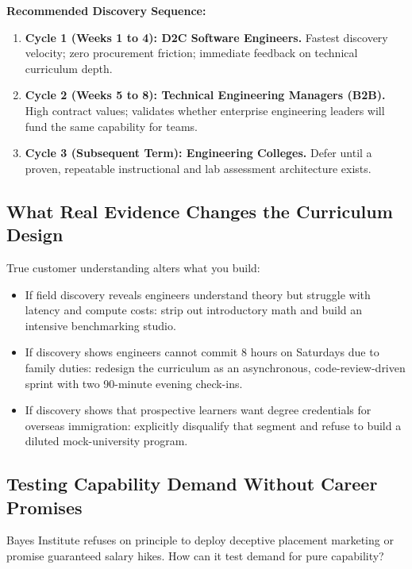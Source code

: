 \noindent\textbf{Recommended Discovery Sequence:}
\begin{enumerate}[leftmargin=1.2em,itemsep=0.2ex]
  \item \textbf{Cycle 1 (Weeks 1 to 4): D2C Software Engineers.} Fastest discovery velocity; zero procurement friction; immediate feedback on technical curriculum depth.
  \item \textbf{Cycle 2 (Weeks 5 to 8): Technical Engineering Managers (B2B).} High contract values; validates whether enterprise engineering leaders will fund the same capability for teams.
  \item \textbf{Cycle 3 (Subsequent Term): Engineering Colleges.} Defer until a proven, repeatable instructional and lab assessment architecture exists.
\end{enumerate}

\subsection{What Real Evidence Changes the Curriculum Design}

True customer understanding alters what you build:
\begin{itemize}[leftmargin=1.2em,itemsep=0.2ex]
  \item If field discovery reveals engineers understand theory but struggle with latency and compute costs: strip out introductory math and build an intensive benchmarking studio.
  \item If discovery shows engineers cannot commit 8 hours on Saturdays due to family duties: redesign the curriculum as an asynchronous, code-review-driven sprint with two 90-minute evening check-ins.
  \item If discovery shows that prospective learners want degree credentials for overseas immigration: explicitly disqualify that segment and refuse to build a diluted mock-university program.
\end{itemize}

\subsection{Testing Capability Demand Without Career Promises}

Bayes Institute refuses on principle to deploy deceptive placement marketing or promise guaranteed salary hikes. How can it test demand for pure capability?

